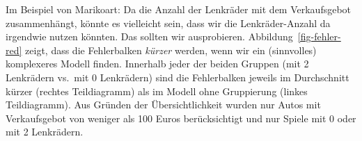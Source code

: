 \documentclass[
  letterpaper,
]{scrbook}
\theoremstyle{definition}
\theoremstyle{definition}
\theoremstyle{definition}
\theoremstyle{remark}
\begin{document}
Im Beispiel von Marikoart: Da die Anzahl der Lenkräder mit dem
Verkaufsgebot zusammenhängt, könnte es vielleicht sein, dass wir die
Lenkräder-Anzahl da irgendwie nutzen könnten. Das sollten wir
ausprobieren. Abbildung~\ref{fig-fehler-red} zeigt, dass die
Fehlerbalken \emph{kürzer} werden, wenn wir ein (sinnvolles) komplexeres
Modell finden. Innerhalb jeder der beiden Gruppen (mit 2 Lenkrädern
vs.~mit 0 Lenkrädern) sind die Fehlerbalken jeweils im Durchschnitt
kürzer (rechtes Teildiagramm) als im Modell ohne Gruppierung (linkes
Teildiagramm). Aus Gründen der Übersichtlichkeit wurden nur Autos mit
Verkaufsgebot von weniger als 100 Euros berücksichtigt und nur Spiele
mit 0 oder mit 2 Lenkrädern.

\begin{figure}

\begin{minipage}{0.50\linewidth}



\end{minipage}%
%
\begin{minipage}{0.50\linewidth}

\end{minipage}
\end{figure}
\end{document}
